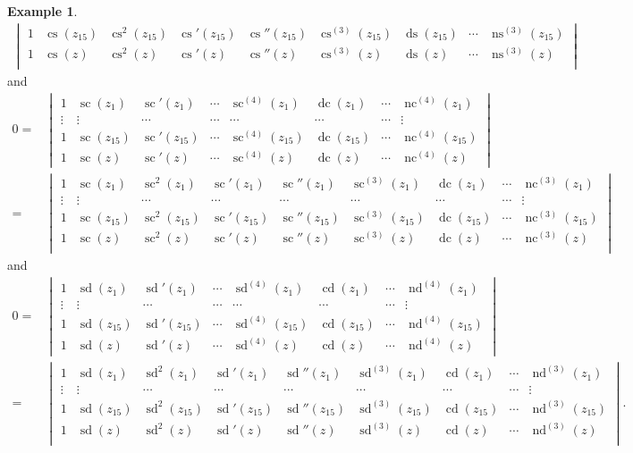 \documentclass{amsart}
\theoremstyle{definition}
\newtheorem{example}[theorem]{Example}
\DeclareMathOperator{\ns}{ns}
\DeclareMathOperator{\nc}{nc}
\DeclareMathOperator{\ds}{ds}
\DeclareMathOperator{\cs}{cs}
\DeclareMathOperator{\nd}{nd}
\DeclareMathOperator{\scJ}{sc}
\DeclareMathOperator{\cd}{cd}
\DeclareMathOperator{\dc}{dc}
\DeclareMathOperator{\sd}{sd}
\begin{document}
\begin{example}
\begin{align*}
\begin{vmatrix}
1&\cs(z_{15}) &\cs^2(z_{15}) & \cs'(z_{15}) & \cs''(z_{15}) & \cs^{(3)}(z_{15}) &\ds(z_{15}) &\cdots &   \ns^{(3)}(z_{15}) \\
1&\cs(z) &\cs^2(z) & \cs'(z) & \cs''(z) & \cs^{(3)}(z) &\ds(z) &\cdots &   \ns^{(3)}(z) \\
\end{vmatrix}
\end{align*}
and
\begin{align*}
    0=&\begin{vmatrix}
1&\scJ(z_1) & \scJ'(z_1) & \cdots & \scJ^{(4)}(z_1) &\dc(z_1) &\cdots &   \nc^{(4)}(z_1) \\
 \vdots&\vdots & \cdots  &  \cdots & \cdots & \cdots & \cdots & \vdots \\
1&\scJ(z_{15}) & \scJ'(z_{15}) & \cdots & \scJ^{(4)}(z_{15}) &\dc(z_{15}) &\cdots &   \nc^{(4)}(z_{15}) \\
1&\scJ(z) & \scJ'(z) & \cdots & \scJ^{(4)}(z) &\dc(z) &\cdots &   \nc^{(4)}(z)
\end{vmatrix}\\
=&\begin{vmatrix}
1&\scJ(z_1) &\scJ^2(z_1) & \scJ'(z_1) &\scJ''(z_1) & \scJ^{(3)}(z_1) &\dc(z_1) &\cdots &   \nc^{(3)}(z_1) \\
 \vdots&\vdots & \cdots  &  \cdots & \cdots & \cdots & \cdots &\cdots & \vdots \\
1&\scJ(z_{15}) &\scJ^2(z_{15}) & \scJ'(z_{15}) &\scJ''(z_{15}) & \scJ^{(3)}(z_{15}) &\dc(z_{15}) &\cdots &   \nc^{(3)}(z_{15}) \\
1&\scJ(z) &\scJ^2(z) & \scJ'(z) &\scJ''(z) & \scJ^{(3)}(z) &\dc(z) &\cdots &   \nc^{(3)}(z) \\
\end{vmatrix}
\end{align*}
and
\begin{align*}
    0=&\begin{vmatrix}
1&\sd(z_1) & \sd'(z_1) & \cdots & \sd^{(4)}(z_1) &\cd(z_1) &\cdots &   \nd^{(4)}(z_1) \\
 \vdots&\vdots & \cdots  &  \cdots & \cdots & \cdots & \cdots & \vdots \\
1&\sd(z_{15}) & \sd'(z_{15}) & \cdots & \sd^{(4)}(z_{15}) &\cd(z_{15}) &\cdots &   \nd^{(4)}(z_{15}) \\
1&\sd(z) & \sd'(z) & \cdots & \sd^{(4)}(z) &\cd(z) &\cdots &   \nd^{(4)}(z) 
\end{vmatrix}\\
=&\begin{vmatrix}
1&\sd(z_1) &\sd^2(z_1) & \sd'(z_1) &\sd''(z_1) & \sd^{(3)}(z_1) &\cd(z_1) &\cdots &   \nd^{(3)}(z_1) \\
 \vdots&\vdots & \cdots  &  \cdots & \cdots & \cdots & \cdots &\cdots & \vdots \\
1&\sd(z_{15}) &\sd^2(z_{15}) & \sd'(z_{15}) &\sd''(z_{15}) & \sd^{(3)}(z_{15}) &\cd(z_{15}) &\cdots &   \nd^{(3)}(z_{15}) \\
1&\sd(z) &\sd^2(z) & \sd'(z) &\sd''(z) & \sd^{(3)}(z) &\cd(z) &\cdots &   \nd^{(3)}(z) \\
\end{vmatrix}.
\end{align*}
\end{example}
\end{document}
